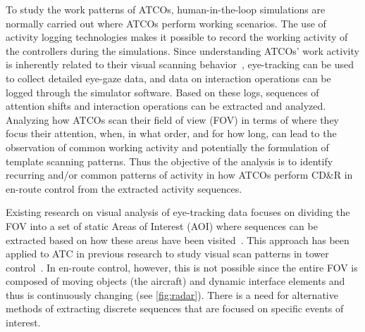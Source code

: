 \documentclass[camera]{vgtc}                          %
\begin{document}
To study the work patterns of ATCOs, human-in-the-loop simulations are normally carried out where ATCOs perform working scenarios.
The use of activity logging technologies makes it possible to record the working activity of the controllers during the simulations. 
Since understanding ATCOs' work activity is inherently related to their visual scanning behavior~\cite{Lundberg2015Situation}, eye-tracking can be used to collect detailed eye-gaze data, and data on interaction operations can be logged through the simulator software. 
Based on these logs, sequences of attention shifts and interaction operations can be extracted and analyzed. Analyzing how ATCOs scan their field of view (FOV) in terms of where they focus their attention, when, in what order, and for how long, can lead to the observation of common working activity and potentially the formulation of template scanning patterns.
Thus the objective of the analysis is to identify recurring and/or common patterns of activity in how ATCOs perform CD\&R in en-route control from the extracted activity sequences. 

Existing research on visual analysis of eye-tracking data focuses on dividing the FOV into a set of static Areas of Interest (AOI) where sequences can be extracted based on how these areas have been visited~\cite{Blascheck2014State, Raschke2014Visual, Burch2021Eye}. This approach has been applied to ATC in previous research to study visual scan patterns in tower control~\cite{westin2019visual}. 
In en-route control, however, this is not possible since the entire FOV is composed of moving objects (the aircraft) and dynamic interface elements and thus is continuously changing (see \autoref{fig:radar}). There is a need for alternative methods of extracting discrete sequences that are focused on specific events of interest. 
\end{document}
